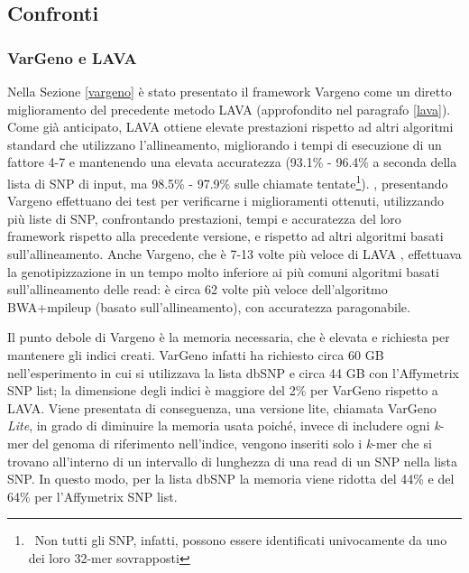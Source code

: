\documentclass[../main.tex]{subfiles}
\begin{document}
\subsection{Confronti}

\subsubsection{VarGeno e LAVA}

Nella Sezione \ref{vargeno} è stato presentato il framework Vargeno come un diretto miglioramento del precedente metodo LAVA (approfondito nel paragrafo \ref{lava}). Come già anticipato, LAVA ottiene elevate prestazioni rispetto ad altri algoritmi standard che utilizzano l'allineamento, migliorando i tempi di esecuzione di un fattore 4-7 e mantenendo una elevata accuratezza (93.1\% - 96.4\% a seconda della lista di SNP di input, ma 98.5\% - 97.9\% sulle chiamate tentate\footnote{\ Non tutti gli SNP, infatti, possono essere identificati univocamente da uno dei loro 32-mer sovrapposti}). \cite{sun-medvedev2018vargeno}, presentando Vargeno effettuano dei test per verificarne i miglioramenti ottenuti, utilizzando più liste di SNP, confrontando prestazioni, tempi e accuratezza del loro framework rispetto alla precedente versione, e rispetto ad altri algoritmi basati sull'allineamento. Anche Vargeno, che è 7-13 volte più veloce di LAVA , effettuava la genotipizzazione in un tempo molto inferiore ai più comuni algoritmi basati sull'allineamento delle read: è circa 62 volte più veloce dell'algoritmo BWA+mpileup (basato sull'allineamento), con accuratezza paragonabile. 

Il punto debole di Vargeno è la memoria necessaria, che è elevata e richiesta per mantenere gli indici creati. VarGeno infatti ha richiesto circa 60 GB nell'esperimento in cui si utilizzava la lista dbSNP e circa 44 GB con l'Affymetrix SNP list; la dimensione degli indici è maggiore del 2\% per VarGeno rispetto a LAVA. Viene presentata di conseguenza, una versione lite, chiamata VarGeno \textit{Lite}, in grado di diminuire la memoria usata poiché, invece di includere ogni \textit{k}-mer del genoma di riferimento nell'indice, vengono inseriti solo i \textit{k}-mer che si trovano all'interno di un intervallo di lunghezza di una read di un SNP nella lista SNP. In questo modo, per la lista dbSNP la memoria viene ridotta del 44\% e del 64\% per l'Affymetrix SNP list.
\end{document}
